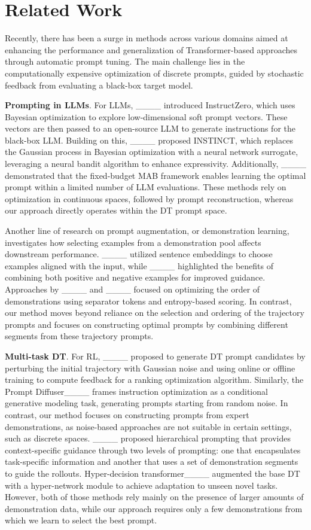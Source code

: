 \section{Related Work}
\label{sec:related_work}
Recently, there has been a surge in methods across various domains aimed at enhancing the performance and generalization of Transformer-based approaches through automatic prompt tuning. The main challenge lies in the computationally expensive optimization of discrete prompts, guided by stochastic feedback from evaluating a black-box target model.

\textbf{Prompting in LLMs}. For LLMs, ____ introduced {I}nstruct{Z}ero, which uses Bayesian optimization to explore low-dimensional soft prompt vectors. These vectors are then passed to an open-source LLM to generate instructions for the black-box LLM. Building on this, ____ proposed INSTINCT, which replaces the Gaussian process in Bayesian optimization with a neural network surrogate, leveraging a neural bandit algorithm to enhance expressivity. Additionally, ____ demonstrated that the fixed-budget MAB framework enables learning the optimal prompt within a limited number of LLM evaluations. These methods rely on optimization in continuous spaces, followed by prompt reconstruction, whereas our approach directly operates within the DT prompt space.

Another line of research on prompt augmentation, or demonstration learning, investigates how selecting examples from a demonstration pool affects downstream performance. ____ utilized sentence embeddings to choose examples aligned with the input, while ____ highlighted the benefits of combining both positive and negative examples for improved guidance. Approaches by ____ and ____ focused on optimizing the order of demonstrations using separator tokens and entropy-based scoring. In contrast, our method moves beyond reliance on the selection and ordering of the trajectory prompts and focuses on constructing optimal prompts by combining different segments from these trajectory prompts.

\textbf{Multi-task DT}. For RL, ____ proposed to generate DT prompt candidates by perturbing the initial trajectory with Gaussian noise and using online or offline training to compute feedback for a ranking optimization algorithm. Similarly, the Prompt Diffuser____ frames instruction optimization as a conditional generative modeling task, generating prompts starting from random noise. In contrast, our method focuses on constructing prompts from expert demonstrations, as noise-based approaches are not suitable in certain settings, such as discrete spaces. ____ proposed hierarchical prompting that provides context-specific guidance through two levels of prompting: one that encapsulates task-specific information and another that uses a set of demonstration segments to guide the rollouts. Hyper-decision transformer____ augmented the base DT with a hyper-network module to achieve adaptation to unseen novel tasks. However, both of those methods rely mainly on the presence of larger amounts of demonstration data, while our approach requires only a few demonstrations from which we learn to select the best prompt.

